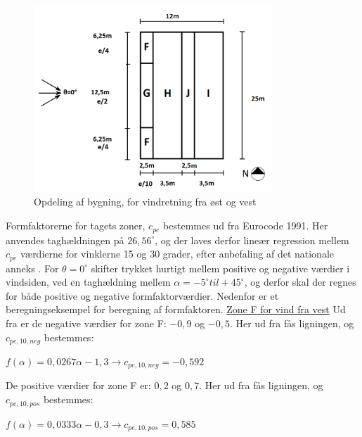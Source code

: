\begin{figure}[htbp]
	\centering
	\includegraphics[width=0.8\textwidth]{billeder/opdeling.png}
	\caption{Opdeling af bygning, for vindretning fra øst og vest \citep[ kapitel 7.2.5]{EU91}}
	\label{fig:opdeling}
\end{figure}

Formfaktorerne for tagets zoner, $c_{pe}$ bestemmes ud fra Eurocode 1991. Her anvendes taghældningen på $26,\!56^{\circ}$, og der laves derfor lineær regression mellem $c_{pe}$ værdierne for vinklerne 15 og 30 grader, efter anbefaling af det nationale anneks \citep[ tabel 7.4a kapitel 7.2.5]{EU91}. For $\theta = 0^{\circ}$ skifter trykket hurtigt mellem positive og negative værdier i vindsiden, ved en taghældning mellem $\alpha = -5^{\circ} til + 45^{\circ}$, og derfor skal der regnes for både positive og negative formfaktorværdier. 
\newline \indent{     }  Nedenfor er et beregningseksempel for beregning af formfaktoren.
\newline
\newline
\underline{Zone F for vind fra vest}
\newline
Ud fra \citep[ tabel 7.4a kapitel 7.2.5]{EU91} er de negative værdier for zone F: $-0,\!9$ og $-0,\!5$. Her ud fra fås ligningen, og $c_{pe,10,neg}$ bestemmes:
\begin{center}
	$f(\alpha)=0,\!0267\alpha - 1,\!3 \to c_{pe,10,neg}=-0,\!592$
\end{center}
De positive værdier for zone F er: $0,\!2$ og $0,\!7$. Her ud fra fås ligningen, og $c_{pe,10,pos}$ bestemmes:
\begin{center}
	$f(\alpha)=0,\!0333\alpha - 0,\!3 \to c_{pe,10,pos}=0,\!585$
\end{center}

